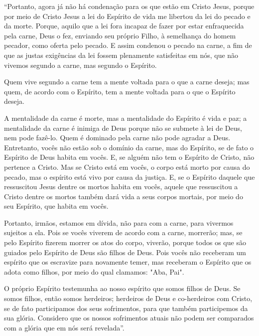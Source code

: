 ``Portanto, agora já não há condenação para os que estão em Cristo Jesus,
porque por meio de Cristo Jesus a lei do Espírito de vida me libertou da lei do pecado e da morte.
Porque, aquilo que a lei fora incapaz de fazer por estar enfraquecida pela carne, Deus o fez, enviando seu próprio Filho, à semelhança do homem pecador, como oferta pelo pecado. E assim condenou o pecado na carne,
a fim de que as justas exigências da lei fossem plenamente satisfeitas em nós, que não vivemos segundo a carne, mas segundo o Espírito.

Quem vive segundo a carne tem a mente voltada para o que a carne deseja; mas quem, de acordo com o Espírito, tem a mente voltada para o que o Espírito deseja.

A mentalidade da carne é morte, mas a mentalidade do Espírito é vida e paz;
a mentalidade da carne é inimiga de Deus porque não se submete à lei de Deus, nem pode fazê-lo.
Quem é dominado pela carne não pode agradar a Deus.
Entretanto, vocês não estão sob o domínio da carne, mas do Espírito, se de fato o Espírito de Deus habita em vocês. E, se alguém não tem o Espírito de Cristo, não pertence a Cristo.
Mas se Cristo está em vocês, o corpo está morto por causa do pecado, mas o espírito está vivo por causa da justiça.
E, se o Espírito daquele que ressuscitou Jesus dentre os mortos habita em vocês, aquele que ressuscitou a Cristo dentre os mortos também dará vida a seus corpos mortais, por meio do seu Espírito, que habita em vocês.

Portanto, irmãos, estamos em dívida, não para com a carne, para vivermos sujeitos a ela.
Pois se vocês viverem de acordo com a carne, morrerão; mas, se pelo Espírito fizerem morrer os atos do corpo, viverão,
porque todos os que são guiados pelo Espírito de Deus são filhos de Deus.
Pois vocês não receberam um espírito que os escravize para novamente temer, mas receberam o Espírito que os adota como filhos, por meio do qual clamamos: "Aba, Pai".

O próprio Espírito testemunha ao nosso espírito que somos filhos de Deus.
Se somos filhos, então somos herdeiros; herdeiros de Deus e co-herdeiros com Cristo, se de fato participamos dos seus sofrimentos, para que também participemos da sua glória.
Considero que os nossos sofrimentos atuais não podem ser comparados com a glória que em nós será revelada''.